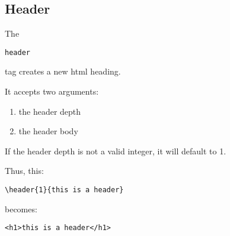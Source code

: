 \subsection{Header}

The \begin{verbatim}header\end{verbatim} tag creates a new html heading.

It accepts two arguments:
\begin{enumerate}
\item the header depth
\item the header body
\end{enumerate}

If the header depth is not a valid integer, it will default to 1.

Thus, this:

\begin{verbatim}
\header{1}{this is a header}
\end{verbatim}

becomes:
\begin{verbatim}
<h1>this is a header</h1>
\end{verbatim}

